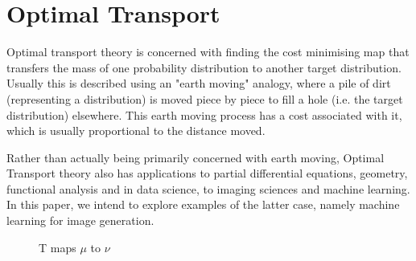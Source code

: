 \chapter{Optimal Transport}
\label{chp:optimal-transport}

\newcommand{\X}{\mathcal{X}}

Optimal transport theory is concerned with finding the cost minimising map that transfers the mass of one probability distribution to another target distribution. Usually this is described using an "earth moving" analogy, where a pile of dirt (representing a distribution) is moved piece by piece to fill a hole (i.e. the target distribution) elsewhere. This earth moving process has a cost associated with it, which is usually proportional to the distance moved.

Rather than actually being primarily concerned with earth moving, Optimal Transport theory also has applications to partial differential equations, geometry, functional analysis and in data science, to imaging sciences and machine learning. In this paper, we intend to explore examples of the latter case, namely machine learning for image generation.

\begin{figure}
\caption{T maps $\mu$ to $\nu$}
\centering
{}
\end{figure}

